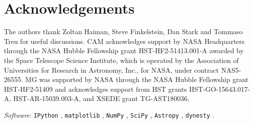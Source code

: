 \documentclass[fleqn,usenatbib]{mnras}
\begin{document}
\section*{Acknowledgements}

The authors thank Zoltan Haiman, Steve Finkelstein, Dan Stark and Tommaso Treu for useful discussions. CAM acknowledges support by NASA Headquarters through the NASA Hubble Fellowship grant HST-HF2-51413.001-A awarded by the Space Telescope Science Institute, which is operated by the Association of Universities for Research in Astronomy, Inc., for NASA, under contract NAS5-26555. MG was supported by NASA through the NASA Hubble Fellowship grant HST-HF2-51409 and acknowledges support from HST grants HST-GO-15643.017-A, HST-AR-15039.003-A, and XSEDE grant TG-AST180036.

\noindent
\textit{Software}: \verb|IPython| \citep{Perez2007a}, \verb|matplotlib| \citep{Hunter2007a}, \verb|NumPy| \citep{VanderWalt2011a}, \verb|SciPy| \citep{Oliphant2007a}, \verb|Astropy| \citep{Robitaille2013}, \verb|dynesty| \citep{Speagle2019}.







\bsp	%
\label{lastpage}
\end{document}
